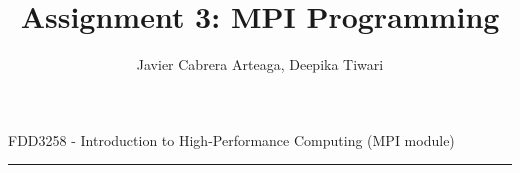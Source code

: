 \documentclass[12pt]{article}
\begin{document}
 
 
\title{Assignment 3: MPI Programming} %
\author{Javier Cabrera Arteaga, Deepika Tiwari} %
 
\maketitle

{%
\centering
FDD3258 - Introduction to High-Performance Computing (MPI module)
\par
}
\hrule
\vspace{.2in}
\end{document}
